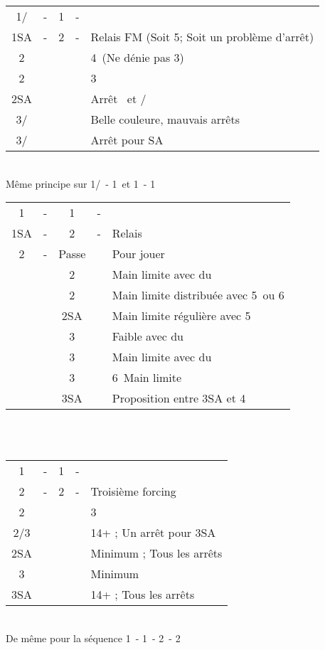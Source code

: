 \documentclass[a4paper, oneside, 11pt]{report}
\begin{document}
	\begin{tabular}{cccc|l}
	1\trefle/\carreau & - & 1\pique & - &\\
	1SA & - & 2\carreau & - & Relais FM (Soit 5\pique ; Soit un problème d'arrêt)\\
	2\coeur &&&& 4\coeur\ (Ne dénie pas 3\pique)\\
	2\pique &&&& 3\pique\\
	2SA &&&& Arrêt \coeur\ et \carreau/\trefle\\
	3\trefle/\carreau &&&& Belle couleure, mauvais arrêts\\
	3\carreau/\trefle &&&& Arrêt pour SA\\
	\end{tabular}\\
	Même principe sur 1\trefle/\carreau\ - 1\coeur\ et 1\coeur\ - 1\pique\\

	\begin{tabular}{cccc|l}
	1\coeur & - & 1\pique & - &\\
	1SA & - & 2\trefle & - & Relais\\
	2\carreau & - & Passe && Pour jouer\\
	&& 2\coeur && Main limite avec du \trefle\\
	&& 2\pique && Main limite distribuée avec 5\pique\ ou 6\pique\\
	&& 2SA && Main limite régulière avec 5\pique\\
	&& 3\trefle && Faible avec du \trefle\\
	&& 3\carreau && Main limite avec du \carreau\\
	&& 3\pique && 6\pique\ Main limite\\
	&& 3SA && Proposition entre 3SA et 4\pique\\
	\end{tabular}\\\\
	
	\begin{tabular}{cccc|l}
	1\trefle & - & 1\coeur & - &\\
	2\trefle & - & 2\carreau & - & Troisième forcing\\
	2\coeur &&&& 3\coeur\\
	2\pique/3\carreau &&&& 14+ ; Un arrêt pour 3SA\\
	2SA &&&& Minimum ; Tous les arrêts\\
	3\trefle &&&& Minimum\\
	3SA &&&& 14+ ; Tous les arrêts\\
	\end{tabular}\\
	De même pour la séquence 1\carreau\ - 1\pique\ - 2\carreau\ - 2\coeur\\
		
\end{document}
